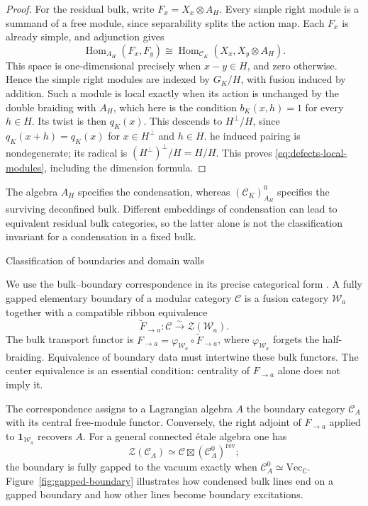 \documentclass[12pt]{amsart}
\makeatletter
\renewcommand\subsection{\@startsection{subsection}{2}%
  \z@{.5\linespacing\@plus.7\linespacing}{-.5em}%
  {\normalfont\bfseries}}
\numberwithin{equation}{section}
\theoremstyle{definition}
\DeclareMathOperator{\Hom}{Hom}
\makeatother
\begin{document}
\begin{proof}
For the residual bulk, write $F_x=X_x\otimes A_H$. Every simple
right module is a summand of a free module, since separability
splits the action map. Each $F_x$ is already simple, and
adjunction gives
$$
\Hom_{A_H}(F_x,F_y)
\cong\Hom_{\mathcal C_K}(X_x,X_y\otimes A_H).
$$
This space is one-dimensional precisely when $x-y\in H$, and zero otherwise. Hence the simple right modules are indexed by $G_K/H$, with fusion induced by addition. Such a module is local exactly when its action is unchanged by the double braiding with $A_H$, which here is the condition $b_K(x,h)=1$ for every $h\in H$. Its twist is then $q_K(x)$. This descends to $H^\perp/H$, since $q_K(x+h)=q_K(x)$ for $x\in H^\perp$ and $h\in H$. he induced pairing is nondegenerate; its radical is $(H^\perp)^\perp/H=H/H$. This proves \eqref{eq:defects-local-modules}, including the dimension formula.
\end{proof}

The algebra $A_H$ specifies the condensation, whereas $(\mathcal C_K)^0_{A_H}$ specifies the surviving deconfined bulk. Different embeddings of condensation  can lead to equivalent residual bulk categories, so the latter alone is not the classification invariant for a condensation in a fixed bulk.

\subsection{Classification of boundaries and domain walls}

We use the bulk--boundary correspondence in its precise categorical
form \cite{Fuchs:2013,DMNO2013}. A fully gapped elementary boundary
of a modular category $\mathcal C$ is a fusion category
$\mathcal W_a$ together with a compatible ribbon equivalence
$$
\widetilde F_{\to a}:\mathcal C\xrightarrow{\sim}
\mathcal Z(\mathcal W_a).
$$
The bulk transport functor is
$F_{\to a}=\varphi_{\mathcal W_a}\circ\widetilde F_{\to a}$,
where $\varphi_{\mathcal W_a}$ forgets the half-braiding.
Equivalence of boundary data must intertwine these bulk functors.
The center equivalence is an essential condition: centrality of
$F_{\to a}$ alone does not imply it.

The correspondence assigns to a Lagrangian algebra $A$ the boundary
category $\mathcal C_A$ with its central free-module functor.
Conversely, the right adjoint of $F_{\to a}$ applied to
$\mathbf1_{\mathcal W_a}$ recovers $A$. For a general connected
\'etale algebra one has
$$
\mathcal Z(\mathcal C_A)\simeq
\mathcal C\boxtimes(\mathcal C_A^0)^{\mathrm{rev}};
$$
the boundary is fully gapped to the vacuum exactly when
$\mathcal C_A^0\simeq\mathrm{Vec}_{\mathbb C}$. Figure~\ref{fig:gapped-boundary} illustrates how condensed bulk lines end on a gapped boundary and how other lines become boundary excitations.
\end{document}
